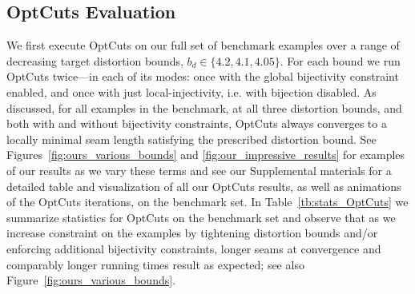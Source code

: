 \subsection{OptCuts Evaluation}




We first execute OptCuts on our full set of benchmark examples over a range of decreasing target distortion bounds, $b_d \in \{4.2, 4.1, 4.05\}$. For each bound we run OptCuts twice---in each of its modes: once with the global bijectivity constraint enabled, and once with just local-injectivity, i.e. with bijection disabled. As discussed, for all examples in the benchmark, at all three distortion bounds, and both with and without bijectivity constraints, OptCuts always converges to a locally minimal seam length satisfying the prescribed distortion bound. See Figures\ \ref{fig:ours_various_bounds} and \ref{fig:our_impressive_results} for examples of our results as we vary these terms and see our Supplemental materials for a detailed table and visualization of all our OptCuts results, as well as animations of the OptCuts iterations, on the benchmark set. In Table~\ref{tb:stats_OptCuts} we summarize statistics for OptCuts on the benchmark set and observe that as we increase constraint on the examples by tightening distortion bounds and/or enforcing additional bijectivity constraints, longer seams at convergence and comparably longer running times result as expected; see also Figure~\ref{fig:ours_various_bounds}.

